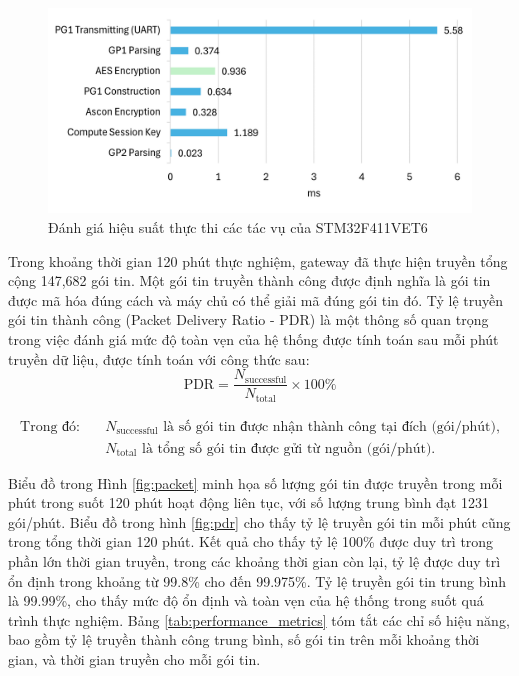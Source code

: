 \begin{figure}[h]
    \centering
    \includegraphics[width=0.8\linewidth]{stm32-2.png}
    \caption{Đánh giá hiệu suất thực thi các tác vụ của STM32F411VET6}
    \label{fig:stm32}
\end{figure}

Trong khoảng thời gian 120 phút thực nghiệm, gateway đã thực hiện truyền tổng cộng 147,682 gói tin. Một gói tin truyền thành công được định nghĩa là gói tin được mã hóa đúng cách và máy chủ có thể giải mã đúng gói tin đó. Tỷ lệ truyền gói tin thành công (Packet Delivery Ratio - PDR) là một thông số quan trọng trong việc đánh giá mức độ toàn vẹn của hệ thống được tính toán sau mỗi phút truyền dữ liệu, được tính toán với công thức sau:
\[
\text{PDR} = \frac{N_{\text{successful}}}{N_{\text{total}}} \times 100\% 
\]

\begin{align*}
\text{Trong đó:} \quad & N_{\text{successful}} \text{ là số gói tin được nhận thành công tại đích (gói/phút),} \\
                       & N_{\text{total}} \text{ là tổng số gói tin được gửi từ nguồn (gói/phút).}
\end{align*}

Biểu đồ trong Hình \ref{fig:packet} minh họa số lượng gói tin được truyền trong mỗi phút trong suốt 120 phút hoạt động liên tục, với số lượng trung bình đạt 1231 gói/phút. Biểu đồ trong hình \ref{fig:pdr} cho thấy tỷ lệ truyền gói tin mỗi phút cũng trong tổng thời gian 120 phút. Kết quả cho thấy tỷ lệ 100\% được duy trì trong phần lớn thời gian truyền, trong các khoảng thời gian còn lại, tỷ lệ được duy trì ổn định trong khoảng từ 99.8\% cho đến 99.975\%. Tỷ lệ truyền gói tin trung bình là 99.99\%, cho thấy mức độ ổn định và toàn vẹn của hệ thống trong suốt quá trình thực nghiệm. Bảng \ref{tab:performance_metrics} tóm tắt các chỉ số hiệu năng, bao gồm tỷ lệ truyền thành công trung bình, số gói tin trên mỗi khoảng thời gian, và thời gian truyền cho mỗi gói tin.

